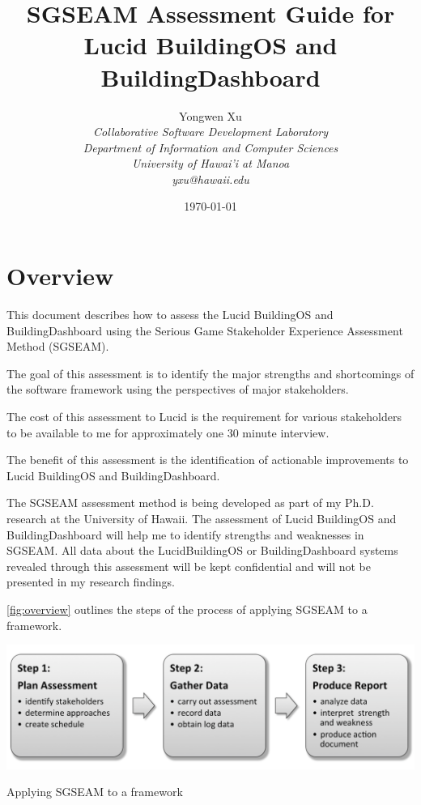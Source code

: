 \documentclass[11pt,oneside]{book}
\title{SGSEAM Assessment Guide for Lucid BuildingOS and BuildingDashboard}
\author{
Yongwen Xu \\
\em  Collaborative Software Development Laboratory \\
\em  Department of Information and Computer Sciences \\
\em  University of Hawai'i at Manoa\\
     yxu@hawaii.edu \\
}
\date{\today}
\begin{document}
\maketitle

\newpage

\tableofcontents
\newpage

\chapter{Overview}

This document describes how to assess the Lucid BuildingOS and
BuildingDashboard using the Serious Game Stakeholder Experience
Assessment Method (SGSEAM). 

The goal of this assessment is to identify the major strengths and
shortcomings of the software framework using the perspectives of major
stakeholders. 

The cost of this assessment to Lucid is the requirement for various
stakeholders to be available to me for approximately one 30 minute interview. 

The benefit of this assessment is the identification of actionable
improvements to Lucid BuildingOS and BuildingDashboard.

The SGSEAM assessment method is being developed as part of my
Ph.D. research at the University of Hawaii.  The assessment of Lucid
BuildingOS and BuildingDashboard will help me to identify strengths
and weaknesses in SGSEAM.  All data about the LucidBuildingOS or
BuildingDashboard systems revealed through this assessment will be kept
confidential and will not be presented in my research findings. 

\autoref{fig:overview} outlines the steps of the process of applying SGSEAM to a framework.

\begin{table}[ht!]
  \center
  \includegraphics[width=0.8\columnwidth]{sgseam-steps}
  \caption{Applying SGSEAM to a framework}
  \label{fig:overview}
\end{table}
\end{document}
